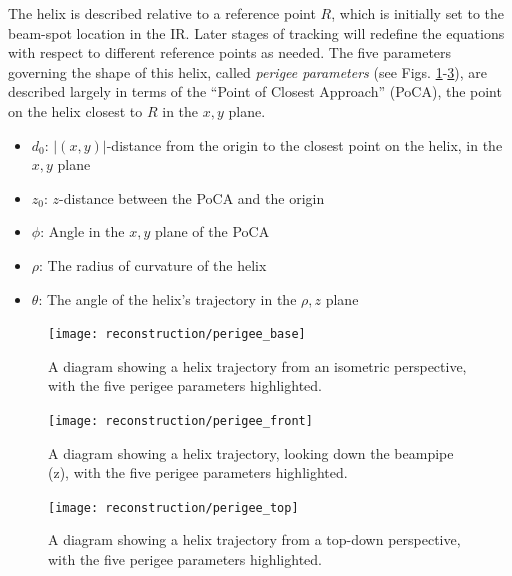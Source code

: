             The helix is described relative to a reference point $R$,
                which is initially set to the beam-spot location in the IR.
            Later stages of tracking will redefine the equations with respect to different reference points as needed.
            The five parameters governing the shape of this helix,
                called \textit{perigee parameters} (see Figs. \ref{fig:perigee_params_base}-\ref{fig:perigee_params_top}),
                are described largely in terms of the ``Point of Closest Approach'' (PoCA),
                the point on the helix closest to $R$ in the $x,y$ plane.
            \begin{itemize}
                \item $d_0$: $|(x,y)|$-distance from the origin to the closest point on the helix, in the $x,y$ plane
                \item $z_0$: $z$-distance between the PoCA and the origin
                \item $\phi$: Angle in the $x,y$ plane of the PoCA
                \item $\rho$: The radius of curvature of the helix
                \item $\theta$: The angle of the helix's trajectory in the $\rho,z$ plane
            \end{itemize}

            \begin{figure}[tbh]
                \texttt{[image: reconstruction/perigee\_base]}
                \caption{
                    A diagram showing a helix trajectory from an isometric perspective,
                        with the five perigee parameters highlighted.
                }
                \label{fig:perigee_params_base}
            \end{figure}

            \begin{figure}[tbh]
                \texttt{[image: reconstruction/perigee\_front]}
                \caption{
                    A diagram showing a helix trajectory, looking down the beampipe (z),
                        with the five perigee parameters highlighted.
                }
                \label{fig:perigee_params_front}
            \end{figure}

            \begin{figure}[tbh]
                \texttt{[image: reconstruction/perigee\_top]}
                \caption{
                    A diagram showing a helix trajectory from a top-down perspective,
                        with the five perigee parameters highlighted.
                }
                \label{fig:perigee_params_top}
            \end{figure}

